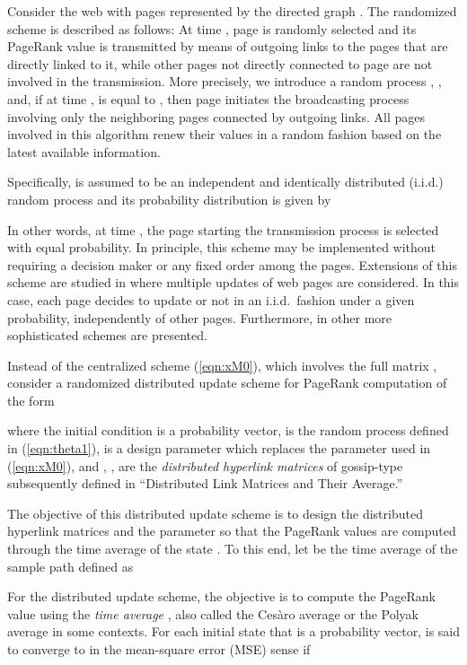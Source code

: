 \documentclass[11pt,draftcls,onecolumn]{IEEEtran}
\begin{document}
Consider the web with  pages represented by the directed graph . 
The randomized scheme is described as follows:
At time , page  is randomly selected and its PageRank value is transmitted by means of outgoing 
links to the pages that are directly linked to it, while other pages not directly connected to 
page  are not involved in the transmission.
More precisely, we introduce a random process , , and, if 
at time ,  is equal to , then page  initiates the broadcasting process 
involving only the neighboring pages connected by outgoing links. All pages involved in this 
algorithm renew their values in a random fashion based on the latest available information.  

Specifically,  is assumed to be an independent and identically distributed (i.i.d.)
random process and its probability distribution is given by

In other words, at time , the page starting the transmission process is selected with equal probability.  In principle, 
this scheme may be implemented without requiring 
a decision maker or any fixed order among the pages. Extensions of this scheme are studied in \cite{IshTem:10}
where multiple updates of web pages are considered. 
In this case, each page decides to update or not 
in an i.i.d.\ fashion under a given probability, independently of other pages. Furthermore, in \cite{IshTemBaiDab:09}
other more sophisticated schemes are presented.


Instead of the centralized scheme (\ref{eqn:xM0}), which involves the full matrix , 
consider a randomized distributed update scheme for PageRank computation of the form

where the initial condition  is a probability vector,  is 
the random process defined in (\ref{eqn:theta1}),  is a design parameter 
which replaces the parameter  used in (\ref{eqn:xM0}), and 
, , are the {\it distributed hyperlink matrices} of gossip-type subsequently 
defined in ``Distributed Link Matrices and Their Average.''




The objective of this distributed update scheme 
is to design the distributed hyperlink matrices  and the parameter 
so that the PageRank values are computed
through the time average of the state . To this end, let  be the time average of 
the sample path  defined as

For the distributed update scheme, the objective is to compute the PageRank value  using 
the {\it time average} , also called the Ces\`aro average or the Polyak average in some contexts.
For each initial state  that is a probability vector, 
 is said to converge to  in the mean-square error (MSE) sense if
\end{document}
